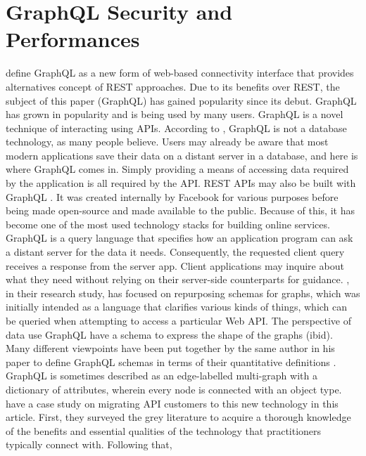\section{GraphQL Security and Performances}
\label{s:GraphQLSecurity}
\citet{hartigInitialAnalysisFacebook2017} define GraphQL as a new form of
web-based connectivity interface that provides alternatives concept of
REST approaches. Due to its benefits over REST, the subject of this paper (GraphQL) has gained
popularity since its debut. GraphQL has grown in popularity and is being used by
many users. GraphQL is a novel technique of interacting using APIs. According to
\citet{ vogelExperiencesMigratingRESTful2018}, GraphQL is not a database
technology, as many people believe. Users may already be aware that most modern
applications save their data on a distant server in a database, and here is
where GraphQL comes in. Simply providing a means of accessing data required by
the application is all required by the API. REST APIs may also be built with
GraphQL \citep{vadlamaniCanGraphQLReplace2021}. It was created internally by
Facebook for various purposes before being made open-source and made available
to the public. Because of this, it has become one of the most used technology
stacks for building online services. GraphQL is a query language that specifies
how an application program can ask a distant server for the data it needs.
Consequently, the requested client query receives a response from the server app.
Client applications may inquire about what they need without relying on their
server-side counterparts for guidance. \citet{
hartigDefiningSchemasProperty2019}, in their research study, has focused on
repurposing schemas for graphs, which was initially intended as a language that clarifies
various kinds of things, which can be queried when attempting to access a
particular Web API. The perspective of data use GraphQL have a
schema to express the shape of the graphs (ibid). Many different viewpoints
have been put together by the same author in his paper to define GraphQL schemas
in terms of their quantitative definitions
\citep{hartigInitialAnalysisFacebook2017}. GraphQL is sometimes described as an
edge-labelled multi-graph with a dictionary of attributes, wherein every node is
connected with an object type. \citet{britoMigratingGraphQLPractical2019} have a
case study on migrating API customers to this new technology in this article.
First, they surveyed the grey literature to acquire a thorough knowledge of the
benefits and essential qualities of the technology that practitioners typically
connect with. Following that, \citet{britoMigratingGraphQLPractical2019}
